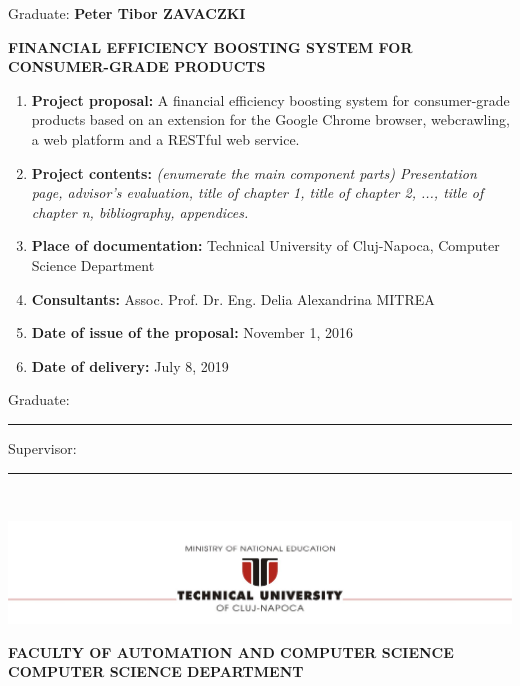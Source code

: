 \documentclass[12pt,a4paper,twoside]{report}
\renewcommand{\thesisauthor}{Peter Tibor ZAVACZKI}    %
\renewcommand{\thesistitle}{FINANCIAL EFFICIENCY BOOSTING SYSTEM FOR CONSUMER-GRADE PRODUCTS}
\renewcommand{\thesissupervisor}{Assoc. Prof. Dr. Eng. Delia Alexandrina MITREA}
\newcommand{\department}{\bf FACULTY OF AUTOMATION AND COMPUTER SCIENCE\\
COMPUTER SCIENCE DEPARTMENT}
\newcommand{\utcnlogo}{\includegraphics[width=15cm]{img/tucn.jpg}}
\newcommand{\uline}[1]{\rule[0pt]{#1}{0.4pt}}
\begin{document}
\vspace{1.6cm}

\begin{center}
  Graduate: {\bf \thesisauthor}

  \vspace{0.6cm}

  {\bf \thesistitle}
\end{center}

\vspace{1cm}

\begin{enumerate}
  \item {\bf Project proposal:} A financial efficiency boosting system for consumer-grade products based on an extension for the Google Chrome browser, webcrawling, a web platform and a RESTful web service.
  \item {\bf Project contents:} {\it (enumerate the main component parts) Presentation page, advisor's evaluation, title of chapter 1, title of chapter 2, ..., title of chapter n, bibliography, appendices.}
  \item {\bf Place of documentation:} Technical University of Cluj-Napoca, Computer Science Department
  \item {\bf Consultants:} \thesissupervisor
  \item {\bf Date of issue of the proposal:} November 1, 2016
  \item {\bf Date of  delivery:} July 8, 2019
\end{enumerate}

\vspace{1.2cm}
\hspace{6cm} Graduate: \uline{6cm}

\vspace{0.5cm}
\hspace{6cm} Supervisor: \uline{6cm}

\thispagestyle{empty}


\newpage
$ $


\thispagestyle{empty}
\newpage

\begin{center}
  \utcnlogo

  \department
\end{center}
\end{document}
